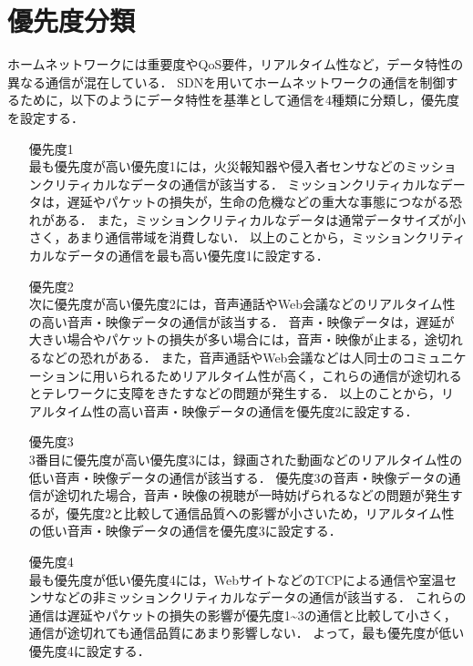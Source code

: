 \documentclass[a4paper,11pt,uplatex]{ujreport}
\begin{document}
\section{優先度分類}
\label{sec:優先度分類}

  ホームネットワークには重要度やQoS要件，リアルタイム性など，データ特性の異なる通信が混在している．
  SDNを用いてホームネットワークの通信を制御するために，以下のようにデータ特性を基準として通信を4種類に分類し，優先度を設定する．

  \begin{itemize}
    \setlength{\leftskip}{1.0cm}
    \item[優先度1]\mbox{}\\
          最も優先度が高い優先度1には，火災報知器や侵入者センサなどのミッションクリティカルなデータの通信が該当する．
          ミッションクリティカルなデータは，遅延やパケットの損失が，生命の危機などの重大な事態につながる恐れがある．
          また，ミッションクリティカルなデータは通常データサイズが小さく，あまり通信帯域を消費しない．
          以上のことから，ミッションクリティカルなデータの通信を最も高い優先度1に設定する．
    \item[優先度2]\mbox{}\\
          次に優先度が高い優先度2には，音声通話やWeb会議などのリアルタイム性の高い音声・映像データの通信が該当する．
          音声・映像データは，遅延が大きい場合やパケットの損失が多い場合には，音声・映像が止まる，途切れるなどの恐れがある．
          また，音声通話やWeb会議などは人同士のコミュニケーションに用いられるためリアルタイム性が高く，これらの通信が途切れるとテレワークに支障をきたすなどの問題が発生する．
          以上のことから，リアルタイム性の高い音声・映像データの通信を優先度2に設定する．
    \item[優先度3]\mbox{}\\
          3番目に優先度が高い優先度3には，録画された動画などのリアルタイム性の低い音声・映像データの通信が該当する．
          優先度3の音声・映像データの通信が途切れた場合，音声・映像の視聴が一時妨げられるなどの問題が発生するが，優先度2と比較して通信品質への影響が小さいため，リアルタイム性の低い音声・映像データの通信を優先度3に設定する．
    \item[優先度4]\mbox{}\\   
          最も優先度が低い優先度4には，WebサイトなどのTCPによる通信や室温センサなどの非ミッションクリティカルなデータの通信が該当する．
          これらの通信は遅延やパケットの損失の影響が優先度1\textasciitilde3の通信と比較して小さく，通信が途切れても通信品質にあまり影響しない．
          よって，最も優先度が低い優先度4に設定する．

  \end{itemize}
\end{document}
